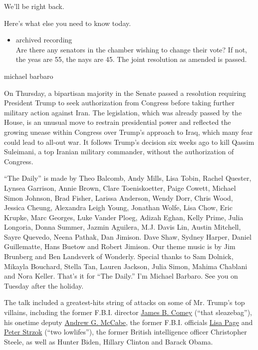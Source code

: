 We'll be right back.

Here's what else you need to know today.

\begin{itemize}
\tightlist
\item
  archived recording\\
  Are there any senators in the chamber wishing to change their vote? If
  not, the yeas are 55, the nays are 45. The joint resolution as amended
  is passed.
\end{itemize}

michael barbaro

On Thursday, a bipartisan majority in the Senate passed a resolution
requiring President Trump to seek authorization from Congress before
taking further military action against Iran. The legislation, which was
already passed by the House, is an unusual move to restrain presidential
power and reflected the growing unease within Congress over Trump's
approach to Iraq, which many fear could lead to all-out war. It follows
Trump's decision six weeks ago to kill Qassim Suleimani, a top Iranian
military commander, without the authorization of Congress.

``The Daily'' is made by Theo Balcomb, Andy Mills, Lisa Tobin, Rachel
Quester, Lynsea Garrison, Annie Brown, Clare Toeniskoetter, Paige
Cowett, Michael Simon Johnson, Brad Fisher, Larissa Anderson, Wendy
Dorr, Chris Wood, Jessica Cheung, Alexandra Leigh Young, Jonathan Wolfe,
Lisa Chow, Eric Krupke, Marc Georges, Luke Vander Ploeg, Adizah Eghan,
Kelly Prime, Julia Longoria, Donna Summer, Jazmin Aguilera, M.J. Davis
Lin, Austin Mitchell, Sayre Quevedo, Neena Pathak, Dan Jimison. Dave
Shaw, Sydney Harper, Daniel Guillematte, Hans Buetow and Robert Jimison.
Our theme music is by Jim Brunberg and Ben Landsverk of Wonderly.
Special thanks to Sam Dolnick, Mikayla Bouchard, Stella Tan, Lauren
Jackson, Julia Simon, Mahima Chablani and Nora Keller. That's it for
``The Daily.'' I'm Michael Barbaro. See you on Tuesday after the
holiday.

The talk included a greatest-hits string of attacks on some of Mr.
Trump's top villains, including the former F.B.I. director
\href{https://www.nytimes.com/2017/05/09/us/politics/james-comey-fired-fbi.html}{James
B. Comey} (``that sleazebag''), his onetime deputy
\href{https://www.nytimes.com/2019/10/01/us/politics/andrew-mccabe-judge-prosecutors.html}{Andrew
G. McCabe}, the former F.B.I. officials
\href{https://www.nytimes.com/2019/12/02/us/trump-lisa-page.html}{Lisa
Page} and
\href{https://www.nytimes.com/2019/08/06/us/politics/peter-strzok-lawsuit.html}{Peter
Strzok} (``two lowlifes''), the former British intelligence officer
Christopher Steele, as well as Hunter Biden, Hillary Clinton and Barack
Obama.

